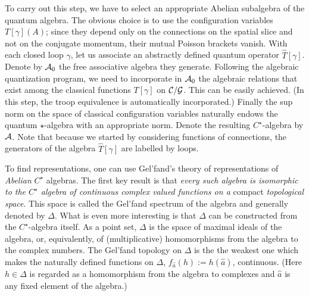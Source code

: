 To carry out this step, we have to select an appropriate Abelian subalgebra
of the quantum algebra.
The obvious choice is to use the configuration variables $T[\gamma](A)$;
since they depend only on the connections on the spatial slice and not on
the conjugate momentum, their mutual Poisson brackets vanish. With each
closed loop $\gamma$, let us associate an abstractly defined quantum
operator $\hat{T}[\gamma ]$. Denote by ${\cal A}_0$ the free associative
algebra they generate. Following the algebraic quantization program, we
need to incorporate in ${\cal A}_0$ the algebraic relations that exist
among the classical functions $T[\gamma ]$ on ${\cal C}/{\cal G}$. This
can be easily achieved. (In this step, the troop equivalence is automatically
incorporated.) Finally the sup norm on the space of classical configuration
variables naturally endows the quantum $\star$-algebra with an appropriate
norm. Denote the resulting $C^\star$-algebra by ${\cal A}$. Note that
because we started by considering functions of connections, the generators
of the algebra $\hat{T}[\gamma]$ are labelled by loops.

To find representations, one can use Gel'fand's theory of representations
of {\it Abelian} $C^\star$ algebras. The first key result is that {\it every
such algebra is isomorphic to the $C^\star$ algebra of continuous complex
valued functions on a} compact {\it topological space}. This space is called
the Gel'fand spectrum of the algebra and generally denoted by $\Delta$.
What is even more interesting is that $\Delta$ can be constructed from the
$C^\star$-algebra itself. As a point set, $\Delta$ is the space of maximal
ideals of the algebra, or, equivalently, of (multiplicative) homomorphisms
from the algebra to the complex numbers. The Gel'fand topology on $\Delta$
is the the weakest one which makes the naturally defined functions on $\Delta$,
$f_{\hat a}(h):= h(\hat a)$, continuous. (Here $h\in \Delta$ is regarded
as a homomorphism from the algebra to complexes and $\hat{a}$ is any fixed
element of the algebra.)

